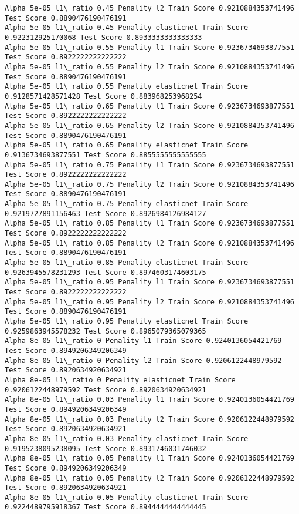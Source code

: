 \documentclass[11pt]{article}
\begin{document}
\begin{Verbatim}[commandchars=\\\{\}]
Alpha 5e-05 l1\_ratio 0.45 Penality l2 Train Score 0.9210884353741496 Test Score 0.8890476190476191
Alpha 5e-05 l1\_ratio 0.45 Penality elasticnet Train Score 0.922312925170068 Test Score 0.8933333333333333
Alpha 5e-05 l1\_ratio 0.55 Penality l1 Train Score 0.9236734693877551 Test Score 0.8922222222222222
Alpha 5e-05 l1\_ratio 0.55 Penality l2 Train Score 0.9210884353741496 Test Score 0.8890476190476191
Alpha 5e-05 l1\_ratio 0.55 Penality elasticnet Train Score 0.9128571428571428 Test Score 0.883968253968254
Alpha 5e-05 l1\_ratio 0.65 Penality l1 Train Score 0.9236734693877551 Test Score 0.8922222222222222
Alpha 5e-05 l1\_ratio 0.65 Penality l2 Train Score 0.9210884353741496 Test Score 0.8890476190476191
Alpha 5e-05 l1\_ratio 0.65 Penality elasticnet Train Score 0.9136734693877551 Test Score 0.8855555555555555
Alpha 5e-05 l1\_ratio 0.75 Penality l1 Train Score 0.9236734693877551 Test Score 0.8922222222222222
Alpha 5e-05 l1\_ratio 0.75 Penality l2 Train Score 0.9210884353741496 Test Score 0.8890476190476191
Alpha 5e-05 l1\_ratio 0.75 Penality elasticnet Train Score 0.9219727891156463 Test Score 0.8926984126984127
Alpha 5e-05 l1\_ratio 0.85 Penality l1 Train Score 0.9236734693877551 Test Score 0.8922222222222222
Alpha 5e-05 l1\_ratio 0.85 Penality l2 Train Score 0.9210884353741496 Test Score 0.8890476190476191
Alpha 5e-05 l1\_ratio 0.85 Penality elasticnet Train Score 0.9263945578231293 Test Score 0.8974603174603175
Alpha 5e-05 l1\_ratio 0.95 Penality l1 Train Score 0.9236734693877551 Test Score 0.8922222222222222
Alpha 5e-05 l1\_ratio 0.95 Penality l2 Train Score 0.9210884353741496 Test Score 0.8890476190476191
Alpha 5e-05 l1\_ratio 0.95 Penality elasticnet Train Score 0.9259863945578232 Test Score 0.8965079365079365
Alpha 8e-05 l1\_ratio 0 Penality l1 Train Score 0.9240136054421769 Test Score 0.8949206349206349
Alpha 8e-05 l1\_ratio 0 Penality l2 Train Score 0.9206122448979592 Test Score 0.8920634920634921
Alpha 8e-05 l1\_ratio 0 Penality elasticnet Train Score 0.9206122448979592 Test Score 0.8920634920634921
Alpha 8e-05 l1\_ratio 0.03 Penality l1 Train Score 0.9240136054421769 Test Score 0.8949206349206349
Alpha 8e-05 l1\_ratio 0.03 Penality l2 Train Score 0.9206122448979592 Test Score 0.8920634920634921
Alpha 8e-05 l1\_ratio 0.03 Penality elasticnet Train Score 0.9195238095238095 Test Score 0.8931746031746032
Alpha 8e-05 l1\_ratio 0.05 Penality l1 Train Score 0.9240136054421769 Test Score 0.8949206349206349
Alpha 8e-05 l1\_ratio 0.05 Penality l2 Train Score 0.9206122448979592 Test Score 0.8920634920634921
Alpha 8e-05 l1\_ratio 0.05 Penality elasticnet Train Score 0.9224489795918367 Test Score 0.8944444444444445

\end{Verbatim}
\end{document}
